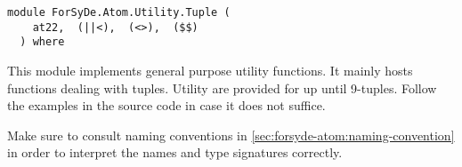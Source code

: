 \label{module:ForSyDe.Atom.Utility.Tuple}
\haddockbeginheader
{\haddockverb\begin{verbatim}
module ForSyDe.Atom.Utility.Tuple (
    at22,  (||<),  (<>),  ($$)
  ) where\end{verbatim}}
\haddockendheader

This module implements general purpose utility functions. It mainly
 hosts functions dealing with tuples. Utility are provided for up
 until 9-tuples. Follow the examples in the source code in case it
 does not suffice.\par
\begin{mdframed}[style=reminder,frametitle=Reminder]Make sure to consult naming conventions in  \cref{sec:forsyde-atom:naming-convention} in order to interpret the names and type signatures correctly.\end{mdframed}\par

